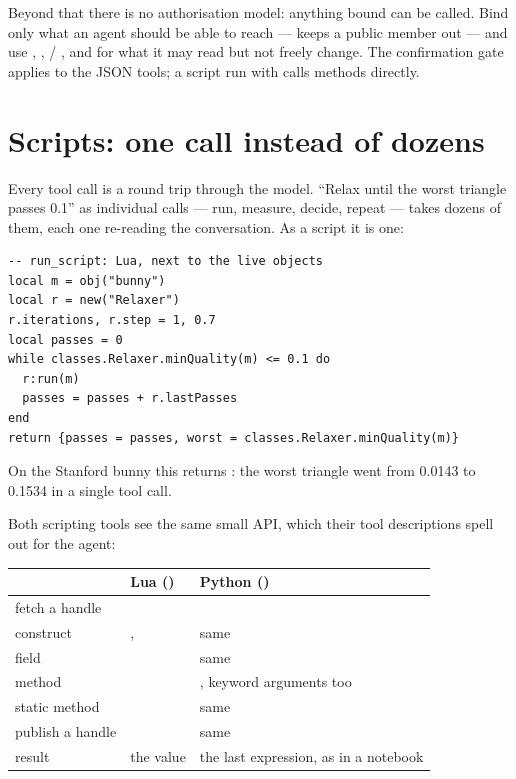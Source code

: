 \begin{warn}
Beyond that there is no authorisation model: anything bound can be called. Bind
only what an agent should be able to reach ---  keeps a public
member out --- and use , ,  /
,  and  for what it may read but not
freely change. The confirmation gate applies to the JSON tools; a script run
with  calls methods directly.
\end{warn}

\section{Scripts: one call instead of dozens}
\label{sec:mcp-scripts}

Every tool call is a round trip through the model. ``Relax until the worst
triangle passes 0.1'' as individual calls --- run, measure, decide, repeat ---
takes dozens of them, each one re-reading the conversation. As a script it is
one:

\begin{lstlisting}[style=plain]
-- run_script: Lua, next to the live objects
local m = obj("bunny")
local r = new("Relaxer")
r.iterations, r.step = 1, 0.7
local passes = 0
while classes.Relaxer.minQuality(m) <= 0.1 do
  r:run(m)
  passes = passes + r.lastPasses
end
return {passes = passes, worst = classes.Relaxer.minQuality(m)}
\end{lstlisting}

On the Stanford bunny this returns : the
worst triangle went from 0.0143 to 0.1534 in a single tool call.

Both scripting tools see the same small API, which their tool descriptions spell
out for the agent:

\begin{center}
\small
\begin{tabular}{@{}L{3.2cm}L{4.6cm}L{5.4cm}@{}}
\toprule
 & \textbf{Lua} () & \textbf{Python} () \\
\midrule
fetch a handle &  &  \\
construct & ,  & same \\
field &  & same \\
method &  & , keyword arguments too \\
static method &  & same \\
publish a handle &  & same \\
result & the  value & the last expression, as in a notebook \\
\bottomrule
\end{tabular}
\end{center}


